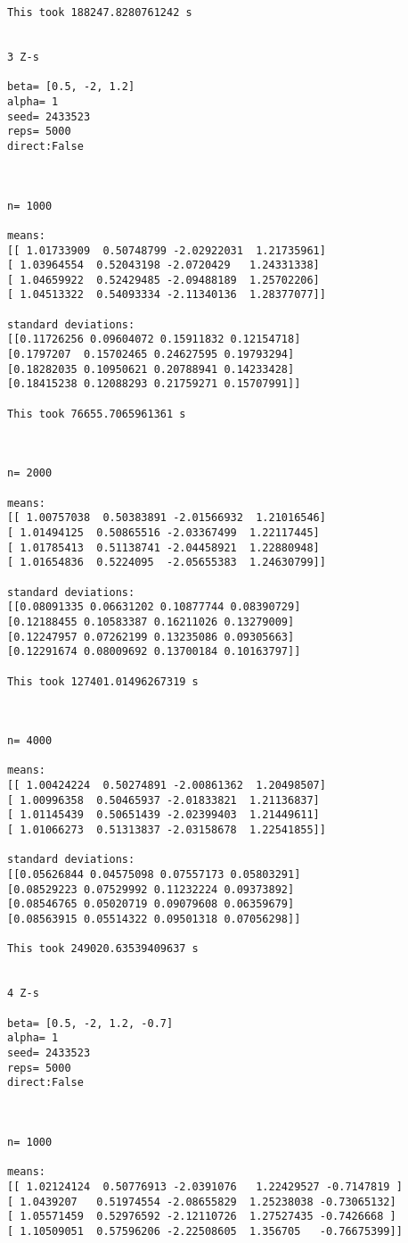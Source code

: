 \documentclass{article}
\theoremstyle{definition}
\theoremstyle{remark}
\begin{document}
\begin{verbatim}
This took 188247.8280761242 s


3 Z-s

beta= [0.5, -2, 1.2]
alpha= 1
seed= 2433523
reps= 5000
direct:False



n= 1000

means: 
[[ 1.01733909  0.50748799 -2.02922031  1.21735961]
[ 1.03964554  0.52043198 -2.0720429   1.24331338]
[ 1.04659922  0.52429485 -2.09488189  1.25702206]
[ 1.04513322  0.54093334 -2.11340136  1.28377077]]

standard deviations: 
[[0.11726256 0.09604072 0.15911832 0.12154718]
[0.1797207  0.15702465 0.24627595 0.19793294]
[0.18282035 0.10950621 0.20788941 0.14233428]
[0.18415238 0.12088293 0.21759271 0.15707991]]

This took 76655.7065961361 s



n= 2000

means: 
[[ 1.00757038  0.50383891 -2.01566932  1.21016546]
[ 1.01494125  0.50865516 -2.03367499  1.22117445]
[ 1.01785413  0.51138741 -2.04458921  1.22880948]
[ 1.01654836  0.5224095  -2.05655383  1.24630799]]

standard deviations: 
[[0.08091335 0.06631202 0.10877744 0.08390729]
[0.12188455 0.10583387 0.16211026 0.13279009]
[0.12247957 0.07262199 0.13235086 0.09305663]
[0.12291674 0.08009692 0.13700184 0.10163797]]

This took 127401.01496267319 s



n= 4000

means: 
[[ 1.00424224  0.50274891 -2.00861362  1.20498507]
[ 1.00996358  0.50465937 -2.01833821  1.21136837]
[ 1.01145439  0.50651439 -2.02399403  1.21449611]
[ 1.01066273  0.51313837 -2.03158678  1.22541855]]

standard deviations: 
[[0.05626844 0.04575098 0.07557173 0.05803291]
[0.08529223 0.07529992 0.11232224 0.09373892]
[0.08546765 0.05020719 0.09079608 0.06359679]
[0.08563915 0.05514322 0.09501318 0.07056298]]

This took 249020.63539409637 s


4 Z-s

beta= [0.5, -2, 1.2, -0.7]
alpha= 1
seed= 2433523
reps= 5000
direct:False



n= 1000

means: 
[[ 1.02124124  0.50776913 -2.0391076   1.22429527 -0.7147819 ]
[ 1.0439207   0.51974554 -2.08655829  1.25238038 -0.73065132]
[ 1.05571459  0.52976592 -2.12110726  1.27527435 -0.7426668 ]
[ 1.10509051  0.57596206 -2.22508605  1.356705   -0.76675399]]


\end{verbatim}
\end{document}
